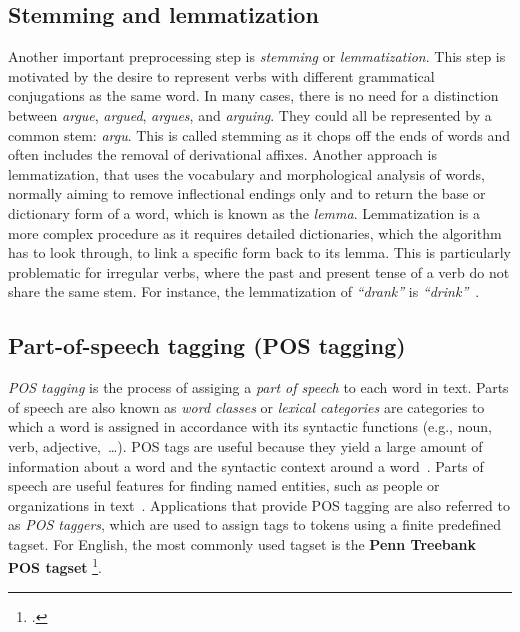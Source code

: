 \subsection{Stemming and  lemmatization}\label{subsec:steming}
Another important preprocessing step is \emph{stemming} or \emph{lemmatization}. This step is motivated by the desire to represent verbs with different grammatical conjugations as the same word.
In many cases, there is no need for a distinction between \emph{argue}, \emph{argued}, \emph{argues}, and \emph{arguing}. They could all be represented by a common stem: \emph{argu}. This is called stemming as it chops off the ends of words and often includes the removal of derivational affixes. Another approach is lemmatization, that uses the vocabulary and morphological analysis of words, normally aiming to remove inflectional endings only and to return the base or dictionary form of a word, which is known as the \emph{lemma}. Lemmatization is a more complex procedure as it requires detailed dictionaries, which the algorithm has to look through, to link a specific form back to its lemma. This is particularly problematic for irregular verbs, where the past and present tense of a verb do not share the same stem. For instance,
the lemmatization of \emph{``drank''} is \emph{``drink''}~.
\subsection{Part-of-speech tagging (POS tagging)}\label{subsec:pos}
\emph{POS tagging} is the process of assiging a\emph{ part of speech} to each word in text. Parts of speech are also known as \emph{word classes} or \emph{lexical categories} are categories to which a word is assigned in accordance with its syntactic functions (e.g., noun, verb, adjective,~\dots). POS tags are useful because they yield a large amount of information about a word and the syntactic context around a word~. Parts of speech are useful features for finding named entities, such as people or organizations in text~. Applications that provide POS tagging are also referred to as \emph{POS taggers}, which are used to assign tags to tokens using a finite predefined tagset. For English, the most commonly used tagset is the \textbf{Penn Treebank POS tagset} \footcite{https://www.ling.upenn.edu/courses/Fall_2003/ling001/penn_treebank_pos.html}. 
